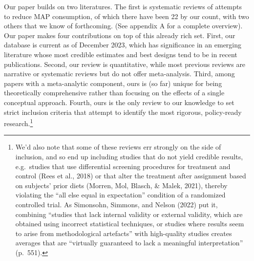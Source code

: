 \documentclass[
  man]{apa6}
\begin{document}
Our paper builds on two literatures. The first is systematic reviews of attempts to reduce MAP consumption, of which there have been 22 by our count, with two others that we know of forthcoming. (See appendix A for a complete overview). Our paper makes four contributions on top of this already rich set. First, our database is current as of December 2023, which has significance in an emerging literature whose most credible estimates and best designs tend to be in recent publications. Second, our review is quantitative, while most previous reviews are narrative or systematic reviews but do not offer meta-analysis. Third, among papers with a meta-analytic component, ours is (so far) unique for being theoretically comprehensive rather than focusing on the effects of a single conceptual approach. Fourth, ours is the only review to our knowledge to set strict inclusion criteria that attempt to identify the most rigorous, policy-ready research.\footnote{We'd also note that some of these reviews err strongly on the side of inclusion, and so end up including studies that do not yield credible results, e.g.~studies that use differential screening procedures for treatment and control (Rees et al., 2018) or that alter the treatment after assignment based on subjects' prior diets (Morren, Mol, Blasch, \& Malek, 2021), thereby violating the ``all else equal in expectation'' condition of a randomized controlled trial. As Simonsohn, Simmons, and Nelson (2022) put it, combining ``studies that lack internal validity or external validity, which are obtained using incorrect statistical techniques, or studies where results seem to arise from methodological artefacts'' with high-quality studies creates averages that are ``virtually guaranteed to lack a meaningful interpretation'' (p.~551).}
\end{document}
